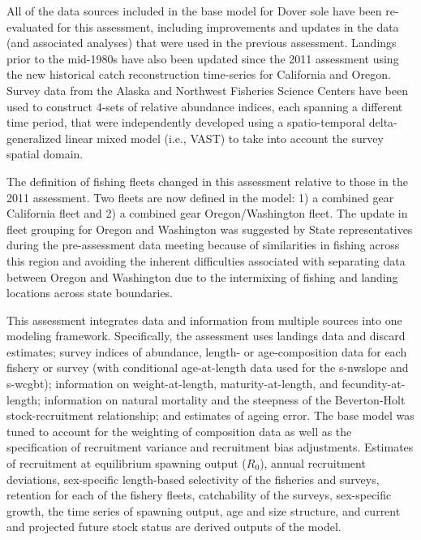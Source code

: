 \documentclass[11pt,
  english,
  a4paper,
]{article}
\begin{document}
\leavevmode\tagmcend\tagstructend\par


All of the data sources included in the base model for Dover sole have been re-evaluated for this assessment, including improvements and updates in the data (and associated analyses) that were used in the previous assessment. Landings prior to the mid-1980s have also been updated since the 2011 assessment using the new historical catch reconstruction time-series for California and Oregon. Survey data from the Alaska and Northwest Fisheries Science Centers have been used to construct 4-sets of relative abundance indices, each spanning a different time period, that were independently developed using a spatio-temporal delta-generalized linear mixed model (i.e., VAST) to take into account the survey spatial domain.

\leavevmode\tagmcend\tagstructend\par


The definition of fishing fleets changed in this assessment relative to those in the 2011 assessment. Two fleets are now defined in the model: 1) a combined gear California fleet and 2) a combined gear Oregon/Washington fleet. The update in fleet grouping for Oregon and Washington was suggested by State representatives during the pre-assessment data meeting because of similarities in fishing across this region and avoiding the inherent difficulties associated with separating data between Oregon and Washington due to the intermixing of fishing and landing locations across state boundaries.

\leavevmode\tagmcend\tagstructend\par


This assessment integrates data and information from multiple sources into one modeling framework. Specifically, the assessment uses landings data and discard estimates; survey indices of abundance, length- or age-composition data for each fishery or survey (with conditional age-at-length data used for the \gls{s-nwslope} and \gls{s-wcgbt}); information on weight-at-length, maturity-at-length, and fecundity-at-length; information on natural mortality and the steepness of the Beverton-Holt stock-recruitment relationship; and estimates of ageing error. The base model was tuned to account for the weighting of composition data as well as the specification of recruitment variance and recruitment bias adjustments. Estimates of recruitment at equilibrium spawning output ({\(R_0\)\leavevmode\tagmcend\tagstructend}), annual recruitment deviations, sex-specific length-based selectivity of the fisheries and surveys, retention for each of the fishery fleets, catchability of the surveys, sex-specific growth, the time series of spawning output, age and size structure, and current and projected future stock status are derived outputs of the model.
\end{document}
